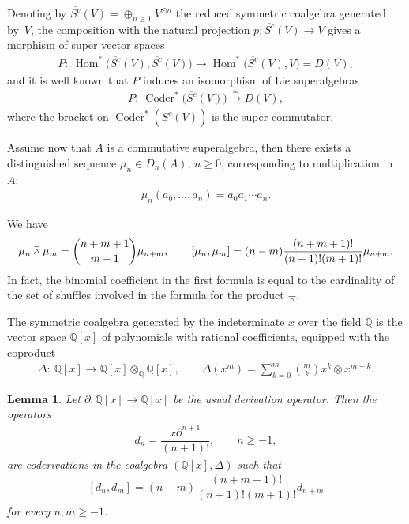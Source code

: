 \documentclass[11pt]{article}
\newcommand{\wedgebar}{\barwedge}
\newcommand{\de}{\partial}
\newcommand{\Hom}{\operatorname{Hom}}
\newcommand{\Coder}{\operatorname{Coder}}
\newcommand{\Q}{\mathbb{Q}}
\numberwithin{equation}{section}
\newtheorem{Lemma}[Theorem]{Lemma}
 { \theoremstyle{definition}
\newtheorem{Definition}[Theorem]{Definition}
\newtheorem{Example}[Theorem]{Example}
\newtheorem{Remark}[Theorem]{Remark} }
\begin{document}
\begin{Remark}\label{rem.coderivationNR}
Denoting by $\overline{S^c}(V)=\oplus_{n\ge 1} V^{\odot n}$ the reduced symmetric coalgebra generated by~$V$,
the composition with the natural projection $p\colon \overline{S^c}(V)\to V$ gives a morphism of super vector spaces
\begin{gather*} P\colon \ \Hom^*\big(\overline{S^c}(V),\overline{S^c}(V)\big)\to \Hom^*\big(\overline{S^c}(V),V\big)=D(V),\end{gather*}
and it is well known \cite{LadaMarkl} that $P$ induces an isomorphism of Lie superalgebras
\begin{gather*} P\colon \ \Coder^*\big(\overline{S^c}(V)\big)\xrightarrow{\simeq} D(V),\end{gather*}
where the bracket on $\Coder^*(\overline{S^c}(V))$ is the super commutator.
\end{Remark}

Assume now that $A$ is a commutative superalgebra, then there exists a distinguished sequence $\mu_n\in D_n(A)$, $n\ge 0$, corresponding to multiplication in~$A$:
\begin{gather*} \mu_n(a_0,\ldots,a_n)=a_0a_1\cdots a_n .\end{gather*}

We have
\begin{gather}\label{equ.bracketmuenne}
\mu_n\wedgebar \mu_m=\dbinom{n+m+1}{m+1}\mu_{n+m},\qquad
[\mu_n,\mu_m]=(n-m)\dfrac{(n+m+1)!}{(n+1)!(m+1)!}
\mu_{n+m} .\end{gather}
In fact, the binomial coef\/f\/icient in the f\/irst formula is equal to the cardinality of the set of shuf\/f\/les involved in the formula for the product $\wedgebar$.

\setcounter{section}{4}
\setcounter{subsection}{0}
\setcounter{subsubsection}{0}
\setcounter{Theorem}{5}
\setcounter{equation}{3}
The symmetric coalgebra generated by the indeterminate $x$ over the f\/ield $\Q$ is the vector space $\Q[x]$ of polynomials with rational coef\/f\/icients, equipped with the coproduct
\begin{gather*} \Delta\colon \ \Q[x]\to \Q[x]\otimes_{\Q} \Q[x],\qquad \Delta(x^m)=\sum_{k=0}^{m}
\binom{m}{k}x^k\otimes x^{m-k}.\end{gather*}

\begin{Lemma}
Let $\de\colon \Q[x]\to \Q[x]$ be the usual derivation operator. Then the operators
\begin{gather*}d_n=\dfrac{x\partial^{n+1}}{ (n+1)! },\qquad n\ge -1,\end{gather*}
are coderivations in the coalgebra
$(\Q[x],\Delta)$ such that
\begin{gather}\label{equ.bracketdenne}
[d_n,d_m]=(n-m)\dfrac{(n+m+1)!}{(n+1)!(m+1)!}
d_{n+m} \end{gather}
for every $n,m\ge -1$.
\end{Lemma}
\end{document}
